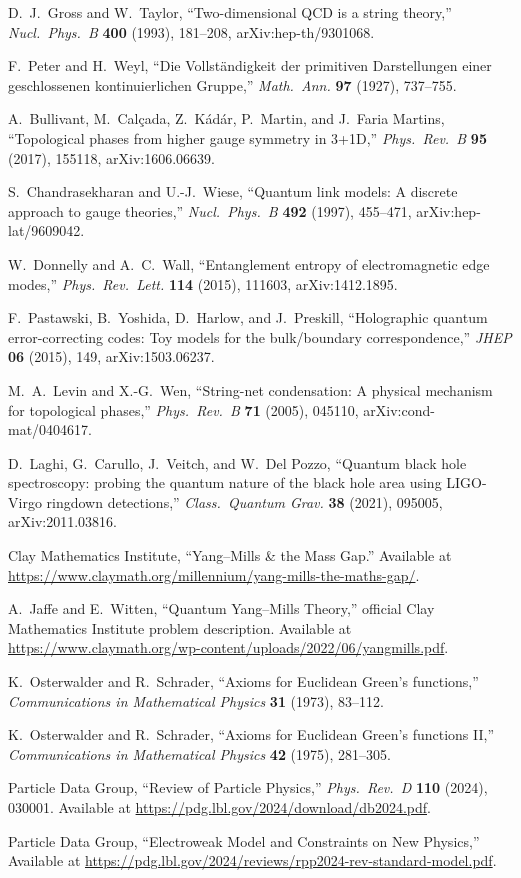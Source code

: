 D.~J.~Gross and W.~Taylor,
``Two-dimensional QCD is a string theory,''
\emph{Nucl.\ Phys.\ B} \textbf{400} (1993), 181--208,
arXiv:hep-th/9301068.

F.~Peter and H.~Weyl,
``Die Vollst\"andigkeit der primitiven Darstellungen einer geschlossenen kontinuierlichen Gruppe,''
\emph{Math.\ Ann.} \textbf{97} (1927), 737--755.

A.~Bullivant, M.~Cal\c{c}ada, Z.~K\'ad\'ar, P.~Martin, and J.~Faria Martins,
``Topological phases from higher gauge symmetry in 3+1D,''
\emph{Phys.\ Rev.\ B} \textbf{95} (2017), 155118,
arXiv:1606.06639.

S.~Chandrasekharan and U.-J.~Wiese,
``Quantum link models: A discrete approach to gauge theories,''
\emph{Nucl.\ Phys.\ B} \textbf{492} (1997), 455--471,
arXiv:hep-lat/9609042.

W.~Donnelly and A.~C.~Wall,
``Entanglement entropy of electromagnetic edge modes,''
\emph{Phys.\ Rev.\ Lett.} \textbf{114} (2015), 111603,
arXiv:1412.1895.

F.~Pastawski, B.~Yoshida, D.~Harlow, and J.~Preskill,
``Holographic quantum error-correcting codes: Toy models for the bulk/boundary correspondence,''
\emph{JHEP} \textbf{06} (2015), 149,
arXiv:1503.06237.

M.~A.~Levin and X.-G.~Wen,
``String-net condensation: A physical mechanism for topological phases,''
\emph{Phys.\ Rev.\ B} \textbf{71} (2005), 045110,
arXiv:cond-mat/0404617.

D.~Laghi, G.~Carullo, J.~Veitch, and W.~Del Pozzo,
``Quantum black hole spectroscopy: probing the quantum nature of the black hole area using LIGO-Virgo ringdown detections,''
\emph{Class.\ Quantum Grav.} \textbf{38} (2021), 095005,
arXiv:2011.03816.

Clay Mathematics Institute,
``Yang--Mills \& the Mass Gap.''
Available at \url{https://www.claymath.org/millennium/yang-mills-the-maths-gap/}.

A.~Jaffe and E.~Witten,
``Quantum Yang--Mills Theory,''
official Clay Mathematics Institute problem description.
Available at \url{https://www.claymath.org/wp-content/uploads/2022/06/yangmills.pdf}.

K.~Osterwalder and R.~Schrader,
``Axioms for Euclidean Green's functions,''
\emph{Communications in Mathematical Physics} \textbf{31} (1973), 83--112.

K.~Osterwalder and R.~Schrader,
``Axioms for Euclidean Green's functions II,''
\emph{Communications in Mathematical Physics} \textbf{42} (1975), 281--305.

Particle Data Group,
``Review of Particle Physics,''
\emph{Phys.\ Rev.\ D} \textbf{110} (2024), 030001.
Available at \url{https://pdg.lbl.gov/2024/download/db2024.pdf}.

Particle Data Group,
``Electroweak Model and Constraints on New Physics,''
Available at \url{https://pdg.lbl.gov/2024/reviews/rpp2024-rev-standard-model.pdf}.
